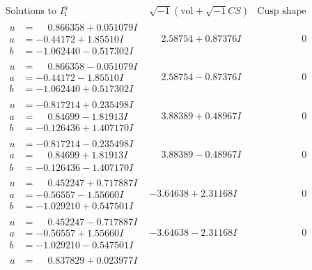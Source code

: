 \documentclass[1p]{elsarticle_modified}
\theoremstyle{definition}
\newcommand{\I}{\sqrt{-1}}
\begin{document}
$$\begin{array}{c|c|c}
\text{Solutions to }I^u_{1}& \I (\text{vol} + \sqrt{-1}CS) & \text{Cusp shape}\\
 \hline 
\begin{aligned}
u &= \phantom{-}0.866358 + 0.051079 I \\
a &= -0.44172 + 1.85510 I \\
b &= -1.062440 - 0.517302 I\end{aligned}
 & \phantom{-}2.58754 + 0.87376 I & \phantom{-0.000000 } 0 \\ \hline\begin{aligned}
u &= \phantom{-}0.866358 - 0.051079 I \\
a &= -0.44172 - 1.85510 I \\
b &= -1.062440 + 0.517302 I\end{aligned}
 & \phantom{-}2.58754 - 0.87376 I & \phantom{-0.000000 } 0 \\ \hline\begin{aligned}
u &= -0.817214 + 0.235498 I \\
a &= \phantom{-}0.84699 - 1.81913 I \\
b &= -0.126436 + 1.407170 I\end{aligned}
 & \phantom{-}3.88389 + 0.48967 I & \phantom{-0.000000 } 0 \\ \hline\begin{aligned}
u &= -0.817214 - 0.235498 I \\
a &= \phantom{-}0.84699 + 1.81913 I \\
b &= -0.126436 - 1.407170 I\end{aligned}
 & \phantom{-}3.88389 - 0.48967 I & \phantom{-0.000000 } 0 \\ \hline\begin{aligned}
u &= \phantom{-}0.452247 + 0.717887 I \\
a &= -0.56557 - 1.55660 I \\
b &= -1.029210 + 0.547501 I\end{aligned}
 & -3.64638 + 2.31168 I & \phantom{-0.000000 } 0 \\ \hline\begin{aligned}
u &= \phantom{-}0.452247 - 0.717887 I \\
a &= -0.56557 + 1.55660 I \\
b &= -1.029210 - 0.547501 I\end{aligned}
 & -3.64638 - 2.31168 I & \phantom{-0.000000 } 0 \\ \hline\begin{aligned}
u &= \phantom{-}0.837829 + 0.023977 I \\

\end{aligned}
\end{array}$$
\end{document}
